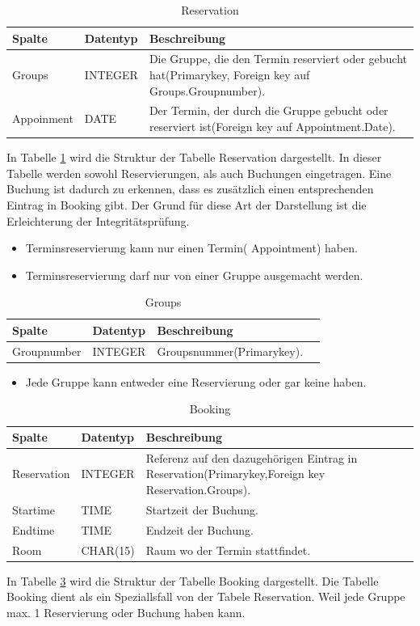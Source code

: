 \documentclass[10pt,a4paper]{article}
\begin{document}
\begin{table}[h]
\centering
	\caption{Reservation}
	\label{tab:Reservation}
    \begin{tabular}{| l | l | l |}
    \hline
    \rowcolor{lightgray} Spalte & Datentyp & Beschreibung  \\ \hline
    Groups & INTEGER & Die Gruppe, die den Termin reserviert oder gebucht hat(Primarykey, Foreign key auf Groups.Groupnumber).  \\ \hline
    Appoinment & DATE & Der Termin, der durch die Gruppe gebucht oder reserviert ist(Foreign key auf Appointment.Date). \\ \hline
    \end{tabular}
\end{table}
In Tabelle \ref{tab:Reservation} wird die Struktur der Tabelle Reservation  dargestellt.  In dieser Tabelle werden sowohl Reservierungen, als auch Buchungen eingetragen. Eine Buchung ist dadurch zu erkennen, dass es zusätzlich einen entsprechenden Eintrag in Booking gibt. Der Grund für diese Art der Darstellung ist die Erleichterung der Integritätsprüfung.

\begin{itemize} 
\item Terminsreservierung kann nur einen Termin( Appointment) haben.
\item Terminsreservierung darf nur von einer Gruppe ausgemacht werden.
\end{itemize}
\begin{table}[h]
\centering
\caption{Groups}
    \label{tab:Groups}    
    \begin{tabular}{| l | l | l | l |}
    \hline
    \rowcolor{lightgray} Spalte & Datentyp & Beschreibung  \\ \hline
    Groupnumber & INTEGER & Groupsnummer(Primarykey).  \\ \hline
   \end{tabular}
\end{table}

\begin{itemize}
\item Jede Gruppe kann entweder eine Reservierung oder gar keine haben. 

\end{itemize}


\begin{table}[h]
\centering
\caption{Booking}
	\label{tab:Booking}
    \begin{tabular}{| l | l | l | l |}
    \hline
    \rowcolor{lightgray} Spalte & Datentyp & Beschreibung  \\ \hline
    Reservation  & INTEGER & Referenz auf den dazugehörigen Eintrag in Reservation(Primarykey,Foreign key Reservation.Groups). \\ \hline
    Startime & TIME & Startzeit der Buchung. \\ \hline
    Endtime & TIME & Endzeit der Buchung. \\ \hline
    Room & CHAR(15) & Raum wo der Termin stattfindet. \\ \hline
    \end{tabular}
\end{table}

In Tabelle \ref{tab:Booking} wird die Struktur der Tabelle Booking dargestellt. Die Tabelle Booking dient als ein Speziallsfall von der Tabele Reservation. Weil jede Gruppe max. 1 Reservierung oder Buchung haben kann.
\end{document}
